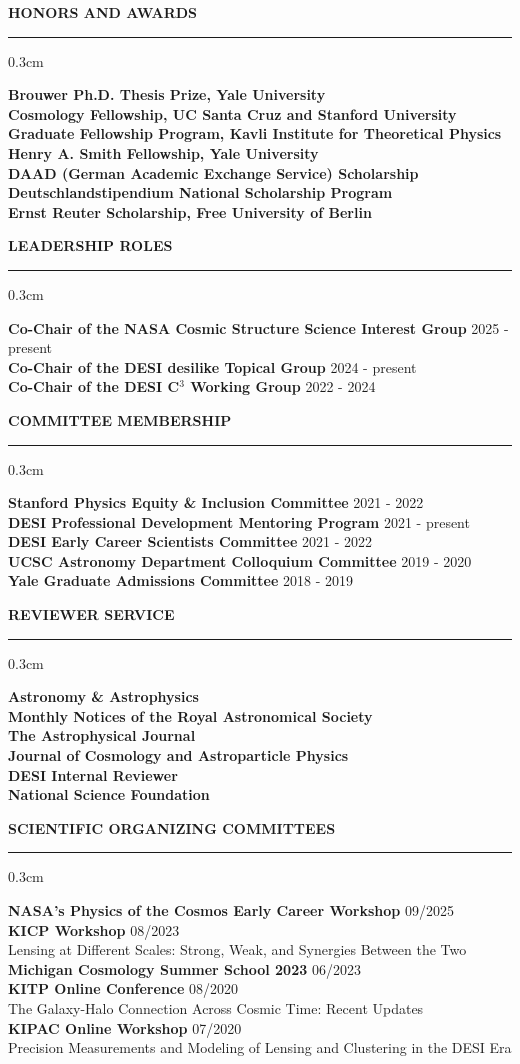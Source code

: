 \documentclass[12pt]{article}
\renewenvironment{section}[1]
  {
  \medskip
  {\color{aublue} \MakeUppercase{\bf #1}}
  \smallskip
  \hrule
  \medskip
  \begin{adjustwidth}{0.3cm}{}
  }
  {
  \end{adjustwidth}
  }
\newcommand{\entry}[3]{{\bf #1} \hfill {#2} \\ {#3}}
\begin{document}
\begin{section}{Honors and Awards}
  \entry{Brouwer Ph.D. Thesis Prize, Yale University}{}{}
  \entry{Cosmology Fellowship, UC Santa Cruz and Stanford University}{}{}
  \entry{Graduate Fellowship Program, Kavli Institute for Theoretical Physics}{}{}
  \entry{Henry A. Smith Fellowship, Yale University}{}{}
  \entry{DAAD (German Academic Exchange Service) Scholarship}{}{}
  \entry{Deutschlandstipendium National Scholarship Program}{}{}
  \entry{Ernst Reuter Scholarship, Free University of Berlin}{}{}
\end{section}

\begin{section}{Leadership Roles}
  \entry{Co-Chair of the NASA Cosmic Structure Science Interest Group}{2025 - present}{}
  \entry{Co-Chair of the DESI desilike Topical Group}{2024 - present}{}
  \entry{Co-Chair of the DESI C$^3$ Working Group}{2022 - 2024}{}
\end{section}

\begin{section}{Committee Membership}
  \entry{Stanford Physics Equity \& Inclusion Committee}{2021 - 2022}{}
  \entry{DESI Professional Development Mentoring Program}{2021 - present}{}
  \entry{DESI Early Career Scientists Committee}{2021 - 2022}{}
  \entry{UCSC Astronomy Department Colloquium Committee}{2019 - 2020}{}
  \entry{Yale Graduate Admissions Committee}{2018 - 2019}{}
\end{section}

\begin{section}{Reviewer Service}
  \entry{Astronomy \& Astrophysics}{}{}
  \entry{Monthly Notices of the Royal Astronomical Society}{}{}
  \entry{The Astrophysical Journal}{}{}
  \entry{Journal of Cosmology and Astroparticle Physics}{}{}
  \entry{DESI Internal Reviewer}{}{}
  \entry{National Science Foundation}{}{}
\end{section}

\begin{section}{Scientific Organizing Committees}
  \entry{NASA's Physics of the Cosmos Early Career Workshop}{09/2025}{}
  \entry{KICP Workshop}{08/2023}{Lensing at Different Scales: Strong, Weak, and Synergies Between the Two} \\
  \entry{Michigan Cosmology Summer School 2023}{06/2023}{}
  \entry{KITP Online Conference}{08/2020}{The Galaxy-Halo Connection Across Cosmic Time: Recent Updates}\\
  \entry{KIPAC Online Workshop}{07/2020}{Precision Measurements and Modeling of Lensing and Clustering in the DESI Era}
\end{section}
\end{document}
